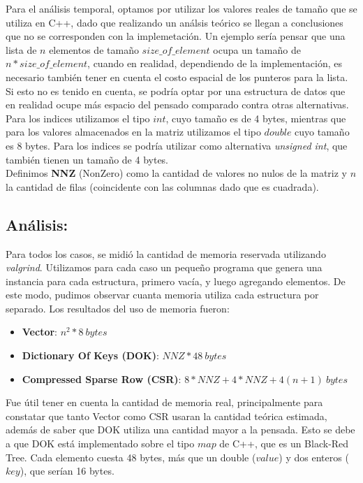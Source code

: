 Para el análisis temporal, optamos por utilizar los valores reales de tamaño que se utiliza en C++, dado que realizando un análsis teórico se llegan a conclusiones que no se corresponden con la implemetación. Un ejemplo sería pensar que una lista de $n$ elementos de tamaño $size\_of\_element$ ocupa un tamaño de $n*size\_of\_element$, cuando en realidad, dependiendo de la implementación, es necesario también tener en cuenta el costo espacial de los punteros para la lista. Si esto no es tenido en cuenta, se podría optar por una estructura de datos que en realidad ocupe más espacio del pensado comparado contra otras alternativas. \\
Para los indices utilizamos el tipo $int$, cuyo tamaño es de 4 bytes, mientras que para los valores almacenados en la matriz utilizamos el tipo $double$ cuyo tamaño es 8 bytes. Para los indices se podría utilizar como alternativa \textit{unsigned int}, que también tienen un tamaño de 4 bytes.\\
Definimos \textbf{NNZ} (NonZero) como la cantidad de valores no nulos de la matriz y $n$ la cantidad de filas (coincidente con las columnas dado que es cuadrada). \\

\subsection{Análisis:}
Para todos los casos, se midió la cantidad de memoria reservada utilizando \textit{valgrind}. Utilizamos para cada caso un pequeño programa que genera una instancia para cada estructura, primero vacía, y luego agregando elementos. De este modo, pudimos observar cuanta memoria utiliza cada estructura por separado. Los resultados del uso de memoria fueron:\\

\begin{itemize}
	\item \textbf{Vector}: $n^2 * 8\ bytes$
	\item \textbf{Dictionary Of Keys (DOK)}: $NNZ * 48\ bytes$
	\item \textbf{Compressed Sparse Row (CSR)}: $8*NNZ + 4*NNZ + 4 (n+1)\ bytes$
\end{itemize}

Fue útil tener en cuenta la cantidad de memoria real, principalmente para constatar que tanto Vector como CSR usaran la cantidad teórica estimada, además de saber que DOK utiliza una cantidad mayor a la pensada. Esto se debe a que DOK está implementado sobre el tipo $map$ de C++, que es un Black-Red Tree. Cada elemento cuesta 48 bytes, más que un double ($value$) y dos enteros ($key$), que serían 16 bytes.  \\

